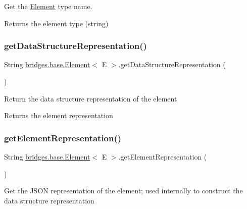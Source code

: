Get the \hyperlink{classbridges_1_1base_1_1_element}{Element} type name. 

\begin{DoxyReturn}{Returns}
the element type (string) 
\end{DoxyReturn}
\mbox{\label{classbridges_1_1base_1_1_element_ab5e21b5941c018501db2ab41a6fb3823}} 
\subsubsection{\texorpdfstring{get\+Data\+Structure\+Representation()}{getDataStructureRepresentation()}}
{\footnotesize\ttfamily String \hyperlink{classbridges_1_1base_1_1_element}{bridges.\+base.\+Element}$<$ E $>$.get\+Data\+Structure\+Representation (\begin{DoxyParamCaption}{ }\end{DoxyParamCaption})}

Return the data structure representation of the element

\begin{DoxyReturn}{Returns}
the element representation 
\end{DoxyReturn}
\mbox{\label{classbridges_1_1base_1_1_element_a8822450cfaf8495bc955d777ad35ea3f}} 
\subsubsection{\texorpdfstring{get\+Element\+Representation()}{getElementRepresentation()}}
{\footnotesize\ttfamily String \hyperlink{classbridges_1_1base_1_1_element}{bridges.\+base.\+Element}$<$ E $>$.get\+Element\+Representation (\begin{DoxyParamCaption}{ }\end{DoxyParamCaption})}

Get the J\+S\+ON representation of the element; used internally to construct the data structure representation

